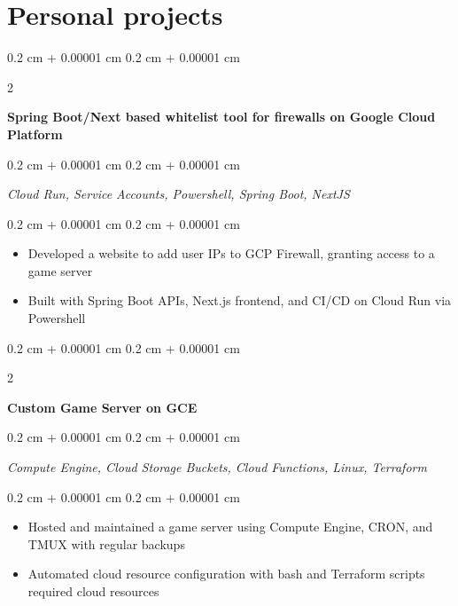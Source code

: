 \documentclass[10pt, letterpaper]{article}
\newenvironment{highlights}{
    \begin{itemize}[
        topsep=0.10 cm,
        parsep=0.10 cm,
        partopsep=0pt,
        itemsep=0pt,
        leftmargin=0.4 cm + 10pt
    ]
}{
    \end{itemize}
} %
\newenvironment{onecolentry}{
    \begin{adjustwidth}{
        0.2 cm + 0.00001 cm
    }{
        0.2 cm + 0.00001 cm
    }
}{
    \end{adjustwidth}
} %
\newenvironment{twocolentry}[2][]{
    \onecolentry
    \def\secondColumn{#2}
    \setcolumnwidth{\fill, 4.5 cm}
    \begin{paracol}{2}
}{
    \switchcolumn\raggedleft\secondColumn
    \end{paracol}
    \endonecolentry
} %
\let\hrefWithoutArrow\href
\renewcommand{\href}[2]{\hrefWithoutArrow{#1}{\ifthenelse{\equal{#2}{}}{ }{#2 }\raisebox{.15ex}{\footnotesize \faExternalLink*}}}
\begin{document}
\section{Personal projects}

\begin{twocolentry}                    {

        \textit{\href{https://github.com/apparentlyarhm/minecraft-terraform}{github}}}
    \textbf{Spring Boot/Next based whitelist tool for firewalls on Google Cloud Platform}
\end{twocolentry}
\begin{onecolentry}
    \textit{Cloud Run, Service Accounts, Powershell, Spring Boot, NextJS}

\end{onecolentry}

\vspace{0.2 cm}
\begin{onecolentry}
    \begin{highlights}
        \item {Developed a website to add user IPs to GCP Firewall, granting access to a game server}
        \item {Built with Spring Boot APIs, Next.js frontend, and CI/CD on Cloud Run via Powershell}    \end{highlights}
\end{onecolentry}

\vspace{0.2 cm}

\begin{twocolentry}                    {

        \textit{}}
    \textbf{Custom Game Server on GCE}
\end{twocolentry}

\begin{onecolentry}
    \textit{Compute Engine, Cloud Storage Buckets, Cloud Functions, Linux, Terraform}
\end{onecolentry}
\vspace{0.2 cm}
\begin{onecolentry}
    \begin{highlights}
        \item {Hosted and maintained a game server using Compute Engine, CRON, and TMUX with regular backups}
        \item {Automated cloud resource configuration with bash and Terraform scripts}        required cloud resources
    \end{highlights}
\end{onecolentry}

\vspace{0.2 cm}
\end{document}
